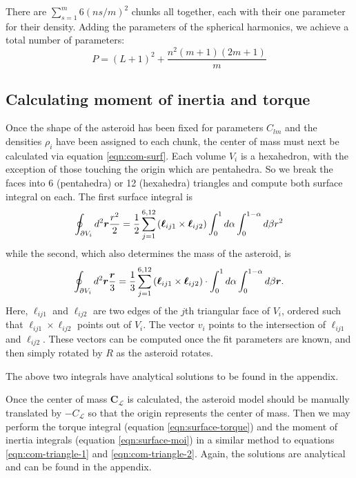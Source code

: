 \documentclass[aps,twocolumn,secnumarabic,balancelastpage,amsmath,amssymb,nofootinbib,floatfix]{revtex4-1}
\begin{document}
There are $\sum_{s=1}^m 6(ns/m)^2$ chunks all together, each with their one parameter for their density. Adding the parameters of the spherical harmonics, we achieve a total number of parameters:
\begin{equation}
    P = (L+1)^2 + \frac{n^2(m+1)(2m+1)}{m}
    \label{eqn:num-parameters}
\end{equation}


\subsection{Calculating moment of inertia and torque}
\label{sec:equations}
Once the shape of the asteroid has been fixed for parameters $C_{lm}$ and the densities $\rho_i$ have been assigned to each chunk, the center of mass must next be calculated via equation \ref{eqn:com-surf}. Each volume $V_i$ is a hexahedron, with the exception of those touching the origin which are pentahedra. So we break the faces into 6 (pentahedra) or 12 (hexahedra) triangles and compute both surface integral on each. The first surface integral is
\begin{equation}
    \oint_{\partial V_i} d^2 \bm r \frac{r^2}{2} =
    \frac{1}{2}\sum_{j=1}^{6, 12} \left( \bm \ell_{ij1}\times\bm \ell_{ij2} \right)\int_0^1 d\alpha \int_0^{1-\alpha} d\beta r^2
    \label{eqn:com-triangle-1}
\end{equation}
while the second, which also determines the mass of the asteroid, is 
\begin{equation}
    \oint_{\partial V_i} d^2 \bm r \frac{\bm r}{3} =
    \frac{1}{3}\sum_{j=1}^{6, 12} \left( \bm \ell_{ij1}\times\bm \ell_{ij2} \right)\cdot \int_0^1 d\alpha \int_0^{1-\alpha} d\beta \bm r.
    \label{eqn:com-triangle-2}
\end{equation}
Here, $\bm \ell_{ij1}$ and $\bm \ell_{ij2}$ are two edges of the $j$th triangular face of $V_i$, ordered such that $\bm \ell_{ij1} \times \bm \ell_{ij2}$ points out of $V_i$. The vector $v_i$ points to the intersection of $\bm \ell_{ij1}$ and $\bm \ell_{ij2}$. These vectors can be computed once the fit parameters are known, and then simply rotated by $R$ as the asteroid rotates.

The above two integrals have analytical solutions to be found in the appendix.

Once the center of mass $\bm C_{\mathcal L}$ is calculated, the asteroid model should be manually translated by $\bm -C_{\mathcal L}$ so that the origin represents the center of mass. Then we may perform the torque integral (equation \ref{eqn:surface-torque}) and the moment of inertia integrals (equation \ref{eqn:surface-moi}) in a similar method to equations \ref{eqn:com-triangle-1} and \ref{eqn:com-triangle-2}. Again, the solutions are analytical and can be found in the appendix.
\end{document}
